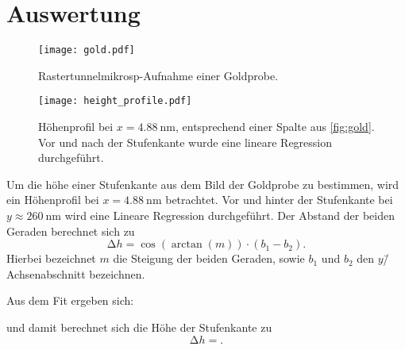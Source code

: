 \section{Auswertung}
\label{sec:Auswertung}

\begin{figure}
  \centering
  \texttt{[image: gold.pdf]}
  \caption{Rastertunnelmikrosp-Aufnahme einer Goldprobe.}
  \label{fig:gold}
\end{figure}


\begin{figure}
  \centering
  \texttt{[image: height\_profile.pdf]}
  \caption{Höhenprofil bei $x=\SI{4.88}{\nano\meter}$, entsprechend einer Spalte aus \autoref{fig:gold}. Vor und nach der Stufenkante wurde eine lineare Regression durchgeführt.}
  \label{fig:profile}
\end{figure}

Um die höhe einer Stufenkante aus dem Bild der Goldprobe zu bestimmen, wird ein Höhenprofil bei $x=\SI{4.88}{\nano\meter}$ betrachtet.
Vor und hinter der Stufenkante bei  $y \approx \SI{260}{\nano\meter}$ wird eine Lineare Regression durchgeführt.
Der Abstand der beiden Geraden berechnet sich zu
\begin{equation}
  \increment h = \cos(\arctan(m)) \cdot (b_1 - b_2).
\end{equation}
Hierbei bezeichnet $m$ die Steigung der beiden Geraden, sowie $b_1$ und $b_2$ den $y$\=/Achsenabschnitt bezeichnen.

Aus dem Fit ergeben sich:

und damit berechnet sich die Höhe der Stufenkante zu
\begin{equation}
  \increment h = .
\end{equation}
